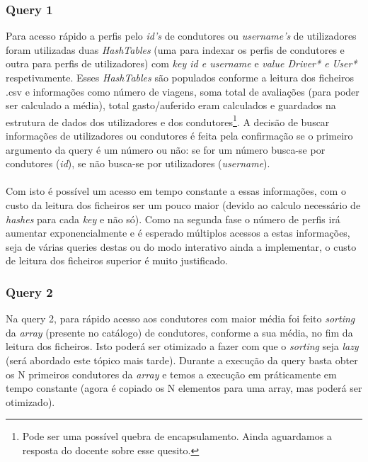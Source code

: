 \documentclass{article}
\begin{document}
        \subsubsection{Query 1}
            Para acesso rápido a perfis pelo \emph{id's} de condutores ou 
            \emph{username's} de utilizadores foram utilizadas duas 
            \emph{HashTables} (uma para indexar os perfis de condutores e outra 
            para perfis de utilizadores) com \emph{key id e username} e 
            \emph{value Driver* e User*} respetivamente. Esses \emph{HashTables}
            são populados conforme a leitura dos ficheiros {.csv} e informações
            como número de viagens, soma total de avaliações (para poder ser 
            calculado a média), total gasto/auferido eram calculados e guardados 
            na estrutura de dados dos utilizadores e dos condutores\footnote{Pode 
            ser uma possível quebra de encapsulamento. Ainda aguardamos a resposta
            do docente sobre esse quesito.}. A decisão de buscar informações de
            utilizadores ou condutores é feita pela confirmação se o primeiro 
            argumento da query é um número ou não: se for um número busca-se por
            condutores (\emph{id}), se não busca-se por utilizadores (\emph{username}).
            \\
            \\Com isto é possível um acesso em tempo constante a essas
            informações, com o custo da leitura dos ficheiros ser um pouco maior
            (devido ao calculo necessário de \emph{hashes} para cada \emph{key} 
            e não só). Como na segunda fase o número de perfis irá aumentar
            exponencialmente e é esperado múltiplos acessos a estas informações, 
            seja de várias queries destas ou do modo interativo ainda a 
            implementar, o custo de leitura dos ficheiros superior é muito 
            justificado.
        \subsubsection{Query 2}
            Na query 2, para rápido acesso aos condutores com maior média foi 
            feito \emph{sorting} da \emph{array} (presente no catálogo) de 
            condutores, conforme a sua média, no fim da leitura dos ficheiros.
            Isto poderá ser otimizado a fazer com que o \emph{sorting} seja
            \emph{lazy} (será abordado este tópico mais tarde).
            Durante a execução da query basta obter os N primeiros 
            condutores da \emph{array} e temos a execução em práticamente em
            tempo constante (agora é copiado os N elementos para uma array, mas
            poderá ser otimizado).
\end{document}
